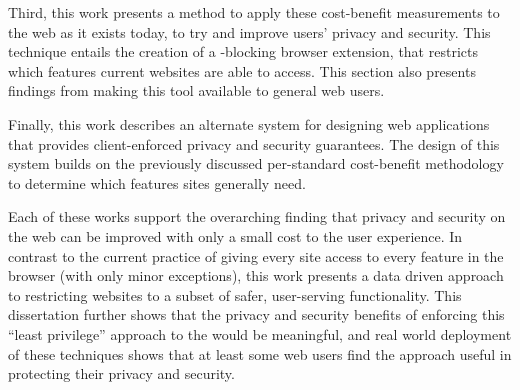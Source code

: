 Third, this work presents a method to apply these cost-benefit measurements
to the web as it exists today, to try and improve users' privacy and security.
This technique entails the creation of a \WAPI-blocking browser extension,
that restricts which features current websites are able to access.  This section
also presents findings from making this tool available to general web users.

Finally, this work describes an alternate system for designing
web applications that provides client-enforced privacy and security guarantees.
The design of this system builds on the previously discussed per-standard
cost-benefit methodology to determine which \WAPI features sites generally need.

Each of these works support the overarching finding that privacy
and security on the web can be improved with only a small cost to the user
experience. In contrast to the current practice of giving every site access
to every feature in the browser (with only minor exceptions), this work presents
a data driven approach to restricting websites to a subset of safer, user-serving
functionality.  This dissertation further shows that the privacy and security
benefits of enforcing this ``least privilege'' approach to the \WAPI would
be meaningful, and real world deployment of these techniques shows that at
least some web users find the approach useful in protecting their privacy and
security.
